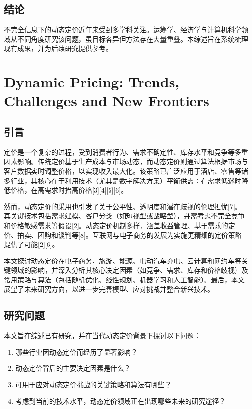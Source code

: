 \subsection{结论}\label{conclusion}

不完全信息下的动态定价近年来受到多学科关注。运筹学、经济学与计算机科学领域从不同角度研究该问题，虽目标各异但方法存在大量重叠。本综述旨在系统梳理现有成果，并为后续研究提供参考。


\section{Dynamic Pricing: Trends, Challenges and New Frontiers}

\subsection{引言}\label{i.-introduction}

定价是一个复杂的过程，受到消费者行为、需求不确定性、库存水平和竞争等多重因素影响。传统定价基于生产成本与市场动态，而动态定价则通过算法根据市场与客户数据实时调整价格，以实现收入最大化。该策略已广泛应用于酒店、零售等诸多行业，其核心在于利用技术（尤其是数字解决方案）平衡供需：在需求低迷时降低价格，在高需求时抬高价格[3][4][5][6]。

然而，动态定价的采用也引发了关于公平性、透明度和潜在歧视的伦理担忧[7]。其关键技术包括需求建模、客户分类（如短视型或战略型），并需考虑不完全竞争和价格敏感需求等假设[2]。动态定价机制多样，涵盖收益管理、基于需求的定价、拍卖、团购和谈判等[8]。互联网与电子商务的发展为实施更精细的定价策略提供了可能[2][6]。

本文探讨动态定价在电子商务、旅游、能源、电动汽车充电、云计算和网约车等关键领域的影响，并深入分析其核心决定因素（如竞争、需求、库存和价格歧视）及常用策略与算法（包括随机优化、线性规划、机器学习和人工智能）。最后，本文展望了未来研究方向，以进一步完善模型、应对挑战并整合新兴技术。

\subsection{研究问题}\label{ii.-research-questions}

本文旨在综述已有研究，并在当代动态定价背景下探讨以下问题：

\begin{enumerate}
	\def\labelenumi{\arabic{enumi}.}
	\item 哪些行业因动态定价而经历了显著影响？
	\item 动态定价背后的主要决定因素是什么？
	\item 可用于应对动态定价挑战的关键策略和算法有哪些？
	\item 考虑到当前的技术水平，动态定价领域正在出现哪些未来的研究途径？
\end{enumerate}

